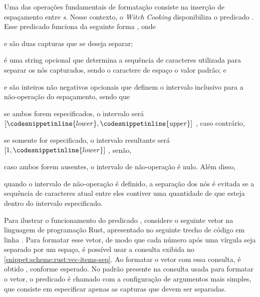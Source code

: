 \documentclass
  [11pt,a4paper,english,brazil,openright,sumario=tradicional,twoside]
  {abntex2}
\newcommand{\witchcooking}{\textit{Witch Cooking}\xspace}
\begin{document}
{{  Uma das operações fundamentais de formatação consiste na inserção de
  espaçamento entre \textit{s}. Nesse contexto, o \witchcooking
  disponibiliza o predicado . Esse predicado funciona
  da seguinte forma ,
  onde
  \begin{inparaenum}
    \item {} e  são duas capturas que
          se deseja separar;
    \item {} é uma string opcional que determina a
          sequência de caracteres utilizada para separar os nós capturados,
          sendo o caractere de espaço o valor padrão; e
    \item {} e  são inteiros
          não negativos opcionais que definem o intervalo inclusivo para a
          não-operação do espaçamento, sendo que
          \begin{inparaenum}
            \item se ambos forem especificados, o intervalo será
                  $ \left
                      [ \codesnippetinline{lower},
                        \codesnippetinline{upper}\right]$%
                  , caso contrário,
            \item se somente  for especificado, o
                  intervalo resultante será
                  $\left[1, \codesnippetinline{lower}\right]$%
                  , senão,
            \item caso ambos forem ausentes, o intervalo de não-operação é
                  nulo. Além disso,
            \item quando o intervalo de não-operação é definido, a separação
                  dos nós é evitada se a sequência de caracteres atual entre
                  eles contiver uma quantidade de  que
                  esteja dentro do intervalo especificado.
          \end{inparaenum}
  \end{inparaenum}

  Para ilustrar o funcionamento do predicado ,
  considere o seguinte vetor na linguagem de programação Rust, apresentado no
  seguinte trecho de código em linha \codesnippetinline[rust]{[0,1,   2,  3]}.
  Para formatar esse vetor, de modo que cada número após uma vírgula seja
  separado por um espaço, é possível usar a consulta exibida no
  \cref{snippet:scheme:rust:vec-items-sep}. Ao formatar o vetor com essa
  consulta, é obtido \codesnippetinline[rust]{[0, 1, 2, 3]}, conforme esperado.
  No padrão presente na consulta usada para formatar o vetor, o predicado
   é chamado com a configuração de argumentos mais
  simples, que consiste em especificar apenas as capturas que devem ser
  separadas.

}}
\end{document}
